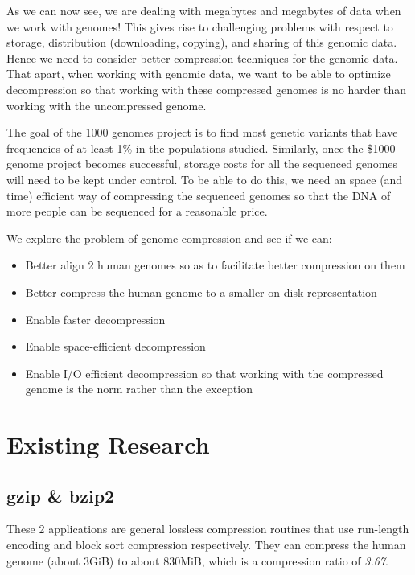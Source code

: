 \documentclass[11pt]{article}
\begin{document}
As we can now see, we are dealing with megabytes and megabytes of data 
when we work with genomes! This gives rise to challenging 
problems with respect to storage, distribution (downloading, copying), 
and sharing of this genomic data. Hence we need to consider better 
compression techniques for the genomic data. That apart, when working
with genomic data, we want to be able to optimize decompression so
that working with these compressed genomes is no harder than working
with the uncompressed genome.

The goal of the 1000 genomes project is to find most genetic variants
that have frequencies of at least 1\% in the populations
studied. Similarly, once the \$1000 genome
project\cite{1000dollargenomeproject} becomes successful, storage
costs for all the sequenced genomes will need to be kept under
control. To be able to do this, we need an space (and time) efficient
way of compressing the sequenced genomes so that the DNA of more
people can be sequenced for a reasonable price.

We explore the problem of genome compression and see if we can:

\begin{itemize}

\item Better align 2 human genomes so as to facilitate better
  compression on them

\item Better compress the human genome to a smaller on-disk
  representation

\item Enable faster decompression

\item Enable space-efficient decompression

\item Enable I/O efficient decompression so that working with the
  compressed genome is the norm rather than the exception

\end{itemize}

\section{Existing Research}

\subsection{gzip \& bzip2}

These 2 applications are general lossless compression routines that
use run-length encoding and block sort compression respectively. They
can compress the human genome (about 3GiB) to about 830MiB, which is a
compression ratio of \textit{3.67}.
\end{document}
